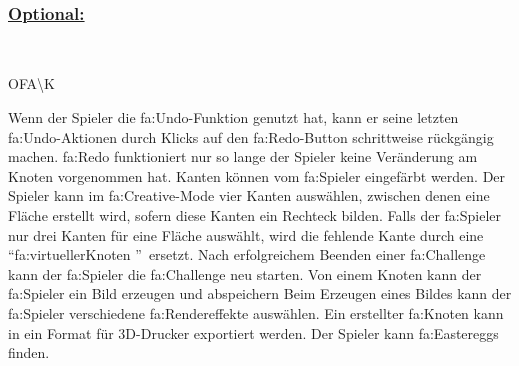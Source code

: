 ~\\


%
%
\subsubsection*{\underline{Optional:}}~\\


\begin{ids}{\gls{OFA\K}}

	\id[ 190] Wenn der Spieler die \gls{fa:Undo}-Funktion genutzt hat, kann er seine letzten \gls{fa:Undo}-Aktionen durch Klicks auf den \gls{fa:Redo}-Button schrittweise rückgängig machen. {\gls{fa:Redo}} funktioniert nur so lange der Spieler keine Veränderung am Knoten vorgenommen hat.
 	\id[ 200] Kanten können vom \gls{fa:Spieler} eingefärbt werden.
 	\id[ 210] Der Spieler kann im \gls{fa:Creative}-Mode vier Kanten auswählen, zwischen denen eine Fläche erstellt wird, sofern diese Kanten ein Rechteck bilden.
 	\id[ 220] Falls der \gls{fa:Spieler} nur drei Kanten für eine Fläche auswählt, wird  die fehlende Kante durch eine \textquotedblleft \gls{fa:virtuellerKnoten} \textquotedblright~ersetzt.
	\id [230] Nach erfolgreichem Beenden einer \gls{fa:Challenge} kann der \gls{fa:Spieler} die \gls{fa:Challenge} neu starten.
 	\id[ 240] Von einem Knoten kann der \gls{fa:Spieler} ein Bild erzeugen und abspeichern
 	\id[ 250] Beim Erzeugen eines Bildes kann der \gls{fa:Spieler} verschiedene \gls{fa:Rendereffekte} auswählen.
 	\id[ 260] Ein erstellter \gls{fa:Knoten} kann in ein Format für 3D-Drucker exportiert werden.
 	\id[ 270] Der Spieler kann \gls{fa:Easteregg}s finden.
 	
	
\end{ids}

~\\